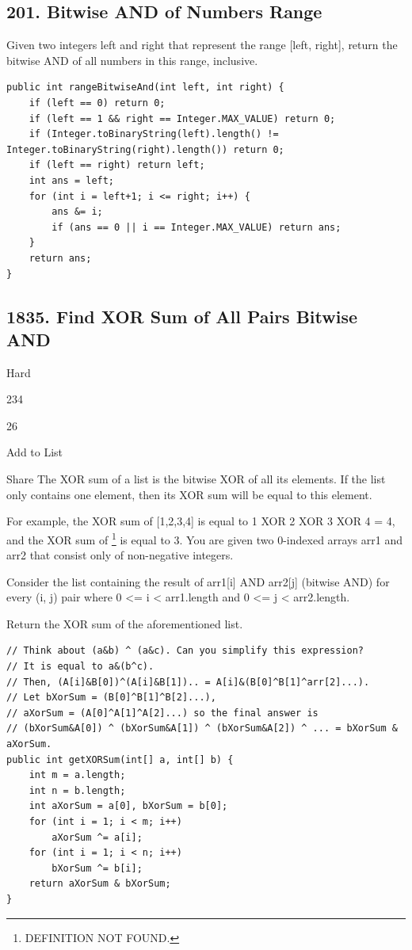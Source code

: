 \documentclass[9pt, b5paper]{article}
\begin{document}
\subsection{201. Bitwise AND of Numbers Range}
\label{sec-2-4}
Given two integers left and right that represent the range [left, right], return the bitwise AND of all numbers in this range, inclusive.
\begin{verbatim}
public int rangeBitwiseAnd(int left, int right) {
    if (left == 0) return 0;
    if (left == 1 && right == Integer.MAX_VALUE) return 0;
    if (Integer.toBinaryString(left).length() != Integer.toBinaryString(right).length()) return 0;
    if (left == right) return left;
    int ans = left;
    for (int i = left+1; i <= right; i++) {
        ans &= i;
        if (ans == 0 || i == Integer.MAX_VALUE) return ans;
    }
    return ans;
}
\end{verbatim}

\subsection{1835. Find XOR Sum of All Pairs Bitwise AND}
\label{sec-2-5}
Hard

234

26

Add to List

Share
The XOR sum of a list is the bitwise XOR of all its elements. If the list only contains one element, then its XOR sum will be equal to this element.

For example, the XOR sum of [1,2,3,4] is equal to 1 XOR 2 XOR 3 XOR 4 = 4, and the XOR sum of \footnote{DEFINITION NOT FOUND.} is equal to 3.
You are given two 0-indexed arrays arr1 and arr2 that consist only of non-negative integers.

Consider the list containing the result of arr1[i] AND arr2[j] (bitwise AND) for every (i, j) pair where 0 <= i < arr1.length and 0 <= j < arr2.length.

Return the XOR sum of the aforementioned list.
\begin{verbatim}
// Think about (a&b) ^ (a&c). Can you simplify this expression?
// It is equal to a&(b^c).
// Then, (A[i]&B[0])^(A[i]&B[1]).. = A[i]&(B[0]^B[1]^arr[2]...).
// Let bXorSum = (B[0]^B[1]^B[2]...),
// aXorSum = (A[0]^A[1]^A[2]...) so the final answer is
// (bXorSum&A[0]) ^ (bXorSum&A[1]) ^ (bXorSum&A[2]) ^ ... = bXorSum & aXorSum.
public int getXORSum(int[] a, int[] b) {
    int m = a.length;
    int n = b.length;
    int aXorSum = a[0], bXorSum = b[0];
    for (int i = 1; i < m; i++) 
        aXorSum ^= a[i];
    for (int i = 1; i < n; i++) 
        bXorSum ^= b[i];
    return aXorSum & bXorSum;
}
\end{verbatim}
\end{document}
